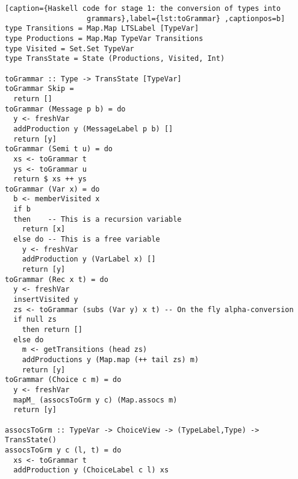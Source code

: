 \begin{lstlisting}[caption={Haskell code for stage 1: the conversion of types into
                   grammars},label={lst:toGrammar} ,captionpos=b]
type Transitions = Map.Map LTSLabel [TypeVar]
type Productions = Map.Map TypeVar Transitions
type Visited = Set.Set TypeVar
type TransState = State (Productions, Visited, Int)

toGrammar :: Type -> TransState [TypeVar]
toGrammar Skip =
  return []
toGrammar (Message p b) = do
  y <- freshVar
  addProduction y (MessageLabel p b) []
  return [y]
toGrammar (Semi t u) = do
  xs <- toGrammar t
  ys <- toGrammar u
  return $ xs ++ ys
toGrammar (Var x) = do
  b <- memberVisited x
  if b
  then    -- This is a recursion variable
    return [x]
  else do -- This is a free variable
    y <- freshVar
    addProduction y (VarLabel x) []
    return [y]
toGrammar (Rec x t) = do
  y <- freshVar
  insertVisited y
  zs <- toGrammar (subs (Var y) x t) -- On the fly alpha-conversion
  if null zs
    then return []
  else do
    m <- getTransitions (head zs)
    addProductions y (Map.map (++ tail zs) m)
    return [y]
toGrammar (Choice c m) = do
  y <- freshVar
  mapM_ (assocsToGrm y c) (Map.assocs m)
  return [y]

assocsToGrm :: TypeVar -> ChoiceView -> (TypeLabel,Type) -> TransState()
assocsToGrm y c (l, t) = do
  xs <- toGrammar t
  addProduction y (ChoiceLabel c l) xs
\end{lstlisting}

